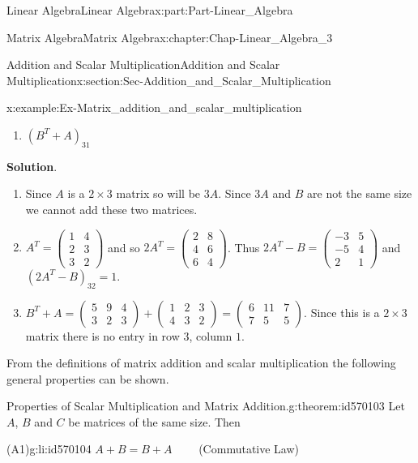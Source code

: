 \documentclass[oneside,10pt,]{book}
\newcommand{\blocktitlefont}{\relax}
\numberwithin{equation}{section}
\newcommand{\amp}{&}
\begin{document}
\begin{partptx}{Linear Algebra}{}{Linear Algebra}{}{}{x:part:Part-Linear_Algebra}
\begin{chapterptx}{Matrix Algebra}{}{Matrix Algebra}{}{}{x:chapter:Chap-Linear_Algebra_3}
\begin{sectionptx}{Addition and Scalar Multiplication}{}{Addition and Scalar Multiplication}{}{}{x:section:Sec-Addition_and_Scalar_Multiplication}
\begin{example}{}{x:example:Ex-Matrix_addition_and_scalar_multiplication}
\begin{enumerate}[label=\alph*]
\item{}\(\displaystyle (B^T+A)_{31}\)%
\end{enumerate}
%
\par\smallskip%
\noindent\textbf{\blocktitlefont Solution}.\hypertarget{g:solution:id570054}{}\quad{}%
\begin{enumerate}[label=\alph*]
\item{}Since \(A\) is a \(2 \times 3\) matrix so will be \(3A\). Since \(3A\) and \(B\) are not the same size we cannot add these two matrices.%
\item{}\(A^T = \begin{pmatrix} 1 \amp 4 \\ 2 \amp 3 \\ 3\amp 2\end{pmatrix}\) and so \(2A^T = \begin{pmatrix} 2 \amp 8 \\ 4 \amp 6 \\ 6 \amp 4\end{pmatrix}\). Thus \(2A^T-B = \begin{pmatrix} -3 \amp 5 \\ -5 \amp 4 \\ 2 \amp 1\end{pmatrix}\) and \((2A^T - B)_{32} =1.\)%
\item{}\(B^T + A = \begin{pmatrix} 5 \amp 9 \amp 4 \\ 3 \amp 2 \amp 3\end{pmatrix} + \begin{pmatrix} 1 \amp 2 \amp 3\\ 4 \amp 3 \amp 2\end{pmatrix} =  \begin{pmatrix} 6 \amp 11 \amp 7\\ 7 \amp 5 \amp 5\end{pmatrix}\). Since this is a \(2 \times 3\)  matrix there is no entry in row \(3\), column \(1\).%
\end{enumerate}
From the definitions of matrix addition and scalar multiplication the following general properties can be shown.%
\end{example}
\begin{theorem}{Properties of Scalar Multiplication and Matrix Addition.}{}{g:theorem:id570103}%
Let \(A\), \(B\) and \(C\) be matrices of the same size. Then%
\begin{descriptionlist}
\begin{dlimedium}{(A1)}{g:li:id570104}%
 \(A+B = B+A \qquad \) (Commutative Law)\end{dlimedium}%

\end{descriptionlist}
\end{theorem}
\end{sectionptx}
\end{chapterptx}
\end{partptx}
\end{document}
